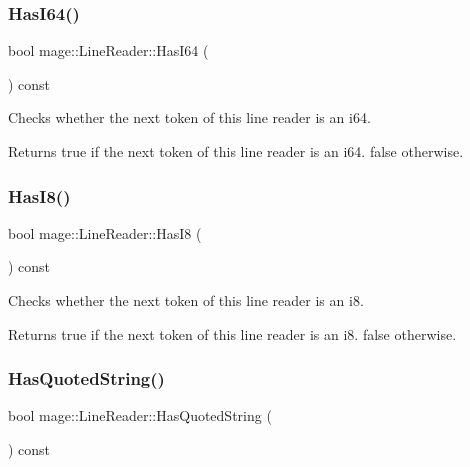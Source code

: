 \subsubsection{\texorpdfstring{Has\+I64()}{HasI64()}}
{\footnotesize\ttfamily bool mage\+::\+Line\+Reader\+::\+Has\+I64 (\begin{DoxyParamCaption}{ }\end{DoxyParamCaption}) const\hspace{0.3cm}{\ttfamily [protected]}}

Checks whether the next token of this line reader is an {\ttfamily i64}.

\begin{DoxyReturn}{Returns}
{\ttfamily true} if the next token of this line reader is an {\ttfamily i64}. {\ttfamily false} otherwise. 
\end{DoxyReturn}
\hypertarget{classmage_1_1_line_reader_a7b7f4e920ac61ca189724ff4a1885738}{}\label{classmage_1_1_line_reader_a7b7f4e920ac61ca189724ff4a1885738} 
\subsubsection{\texorpdfstring{Has\+I8()}{HasI8()}}
{\footnotesize\ttfamily bool mage\+::\+Line\+Reader\+::\+Has\+I8 (\begin{DoxyParamCaption}{ }\end{DoxyParamCaption}) const\hspace{0.3cm}{\ttfamily [protected]}}

Checks whether the next token of this line reader is an {\ttfamily i8}.

\begin{DoxyReturn}{Returns}
{\ttfamily true} if the next token of this line reader is an {\ttfamily i8}. {\ttfamily false} otherwise. 
\end{DoxyReturn}
\hypertarget{classmage_1_1_line_reader_ac92de9a3d986c7031c902c9489cfaa5a}{}\label{classmage_1_1_line_reader_ac92de9a3d986c7031c902c9489cfaa5a} 
\subsubsection{\texorpdfstring{Has\+Quoted\+String()}{HasQuotedString()}}
{\footnotesize\ttfamily bool mage\+::\+Line\+Reader\+::\+Has\+Quoted\+String (\begin{DoxyParamCaption}{ }\end{DoxyParamCaption}) const\hspace{0.3cm}{\ttfamily [protected]}}

